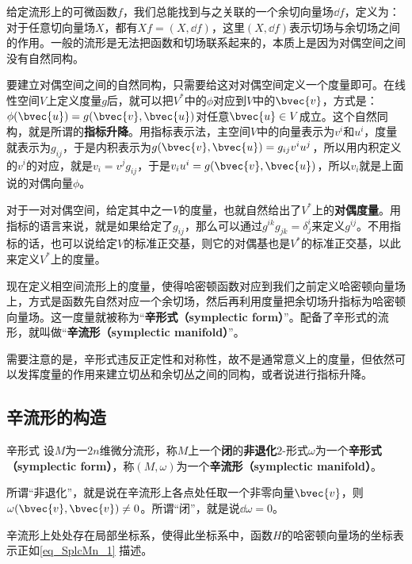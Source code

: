 给定流形上的可微函数$f$，我们总能找到与之关联的一个余切向量场$\dd f$，定义为：对于任意切向量场$X$，都有$Xf = (X, \dd f)$，这里$(X, \dd f)$表示切场与余切场之间的作用。一般的流形是无法把函数和切场联系起来的，本质上是因为对偶空间之间没有自然同构。

要建立对偶空间之间的自然同构，只需要给这对对偶空间定义一个度量即可。在线性空间$V$上定义度量$g$后，就可以把$V^*$中的$\phi$对应到$V$中的$\bvec{v}$，方式是：$\phi(\bvec{u})=g(\bvec{v}, \bvec{u})$对任意$\bvec{u}\in V$成立。这个自然同构，就是所谓的\textbf{指标升降}。用指标表示法，主空间$V$中的向量表示为$v^i$和$u^i$，度量就表示为$g_{ij}$，于是内积表示为$g(\bvec{v}, \bvec{u})=g_{ij}v^iu^j$，所以用内积定义的$v^i$的对应，就是$v_i=v^jg_{ij}$，于是$v_iu^i=g(\bvec{v}, \bvec{u})$，所以$v_i$就是上面说的对偶向量$\phi$。

对于一对对偶空间，给定其中之一$V$的度量，也就自然给出了$V^*$上的\textbf{对偶度量}。用指标的语言来说，就是如果给定了$g_{ij}$，那么可以通过$g^{ik}g_{jk}=\delta^i_j$来定义$g^{ij}$。不用指标的话，也可以说给定$V$的标准正交基，则它的对偶基也是$V^*$的标准正交基，以此来定义$V^*$上的度量。

现在定义相空间流形上的度量，使得哈密顿函数对应到我们之前定义哈密顿向量场上，方式是函数先自然对应一个余切场，然后再利用度量把余切场升指标为哈密顿向量场。这一度量就被称为“\textbf{辛形式（symplectic form）}”。配备了辛形式的流形，就叫做“\textbf{辛流形（symplectic manifold）}”。

需要注意的是，辛形式违反正定性和对称性，故不是通常意义上的度量，但依然可以发挥度量的作用来建立切丛和余切丛之间的同构，或者说进行指标升降。


\subsection{辛流形的构造}




\begin{definition}{辛形式}
设$M$为一$2n$维微分流形，称$M$上一个\textbf{闭}的\textbf{非退化}$2$-形式$\omega$为一个\textbf{辛形式（symplectic form）}，称$(M, \omega)$为一个\textbf{辛流形（symplectic manifold）}。
\end{definition}

所谓“非退化”，就是说在辛流形上各点处任取一个非零向量$\bvec{v}$，则$\omega(\bvec{v}, \bvec{v})\neq 0$。所谓“闭”，就是说$\dd \omega =0$。

辛流形上处处存在局部坐标系，使得此坐标系中，函数$H$的哈密顿向量场的坐标表示正如\autoref{eq_SplcMn_1} 描述。
























